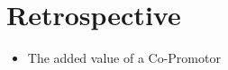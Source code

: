 \chapter{Retrospective}
\lipsum[1]

\begin{itemize}
	\item{The added value of a Co-Promotor}
\end{itemize}
